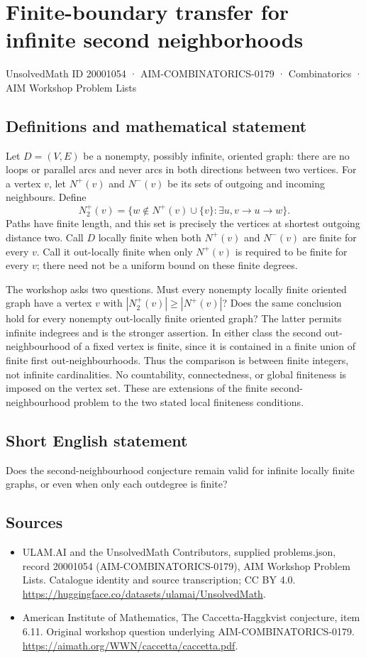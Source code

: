 \documentclass[11pt,a4paper]{article}
\begin{document}
\section*{Finite-boundary transfer for infinite second neighborhoods}\label{20001054}
{\small UnsolvedMath ID 20001054 · AIM-COMBINATORICS-0179 · Combinatorics · AIM Workshop Problem Lists}
\subsection{Definitions and mathematical statement}
Let $D=(V,E)$ be a nonempty, possibly infinite, oriented graph: there
are no loops or parallel arcs and never arcs in both directions
between two vertices. For a vertex $v$, let $N^+(v)$ and $N^-(v)$
be its sets of outgoing and incoming neighbours. Define
\[
 N_2^+(v)=\{w\notin N^+(v)\cup\{v\}:\exists u, v\to u\to w\}.
\]
Paths have finite length, and this set is precisely the vertices at
shortest outgoing distance two.
Call $D$ locally finite when both $N^+(v)$ and $N^-(v)$ are finite
for every $v$. Call it out-locally finite when only $N^+(v)$ is
required to be finite for every $v$; there need not be a uniform
bound on these finite degrees.

The workshop asks two questions. Must every nonempty locally finite
oriented graph have a vertex $v$ with
$|N_2^+(v)|\ge|N^+(v)|$? Does the same conclusion hold for every
nonempty out-locally finite oriented graph?
The latter permits infinite indegrees and is the stronger assertion.
In either class the second out-neighbourhood of a fixed vertex is
finite, since it is contained in a finite union of finite first
out-neighbourhoods. Thus the comparison is between finite integers,
not infinite cardinalities. No countability, connectedness, or global
finiteness is imposed on the vertex set. These are extensions of the
finite second-neighbourhood problem to the two stated local finiteness
conditions.
\subsection{Short English statement}
Does the second-neighbourhood conjecture remain valid for infinite locally finite graphs, or even when only each outdegree is finite?
\subsection{Sources}
\begin{itemize}
\item[S1] ULAM.AI and the UnsolvedMath Contributors, supplied problems.json, record 20001054 (AIM-COMBINATORICS-0179), AIM Workshop Problem Lists. Catalogue identity and source transcription; CC BY 4.0.
\url{https://huggingface.co/datasets/ulamai/UnsolvedMath}.
\item[S2] American Institute of Mathematics, The Caccetta-Haggkvist conjecture, item 6.11. Original workshop question underlying AIM-COMBINATORICS-0179.
\url{https://aimath.org/WWN/caccetta/caccetta.pdf}.
\end{itemize}
\end{document}
